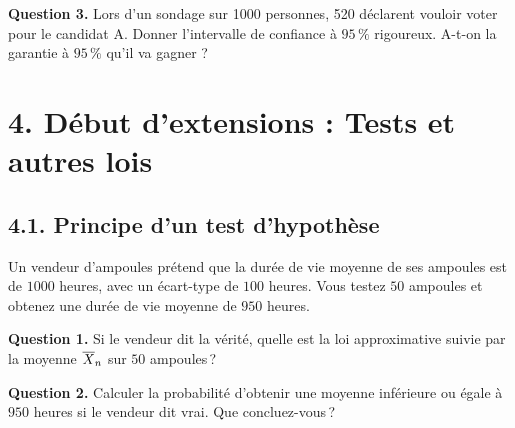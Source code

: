 \textbf{Question 3.} Lors d'un sondage sur 1000 personnes, 520 déclarent vouloir voter pour le candidat A. Donner l'intervalle de confiance à $95\,\%$ rigoureux. A-t-on la garantie à $95\,\%$ qu'il va gagner ?

\section*{4. Début d'extensions : Tests et autres lois}

\subsection*{4.1. Principe d'un test d'hypothèse}

Un vendeur d'ampoules prétend que la durée de vie moyenne de ses ampoules est de $1000$ heures, avec un écart-type de $100$ heures. Vous testez $50$ ampoules et obtenez une durée de vie moyenne de $950$ heures.

\medskip

\textbf{Question 1.} Si le vendeur dit la vérité, quelle est la loi approximative suivie par la moyenne $\overline{X}_n$ sur $50$ ampoules\,?


\textbf{Question 2.} Calculer la probabilité d'obtenir une moyenne inférieure ou égale à $950$ heures si le vendeur dit vrai. Que concluez-vous\,?


